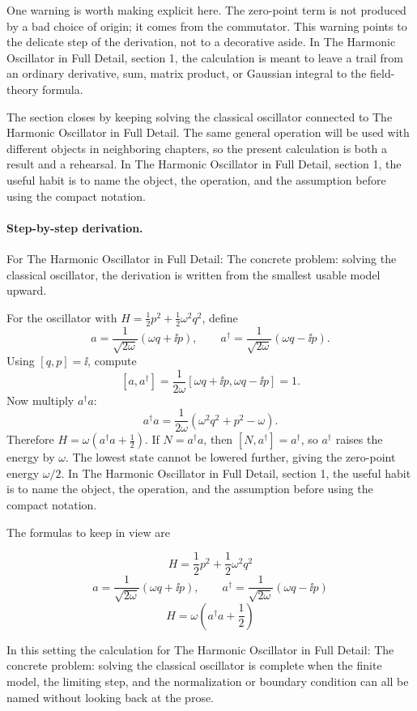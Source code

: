 One warning is worth making explicit here.  The zero-point term is not produced by a bad choice of origin; it comes from the commutator.  This warning points to the delicate step of the derivation, not to a decorative aside.  In The Harmonic Oscillator in Full Detail, section 1, the calculation is meant to leave a trail from an ordinary derivative, sum, matrix product, or Gaussian integral to the field-theory formula.

The section closes by keeping solving the classical oscillator connected to The Harmonic Oscillator in Full Detail.  The same general operation will be used with different objects in neighboring chapters, so the present calculation is both a result and a rehearsal.  In The Harmonic Oscillator in Full Detail, section 1, the useful habit is to name the object, the operation, and the assumption before using the compact notation.



\paragraph{Step-by-step derivation.}

For The Harmonic Oscillator in Full Detail: The concrete problem: solving the classical oscillator, the derivation is written from the smallest usable model upward.

For the oscillator with \(H=\frac12p^2+\frac12\omega^2q^2\), define
\[
  a=\frac{1}{\sqrt{2\omega}}(\omega q+\ii p),\qquad
  a^\dagger=\frac{1}{\sqrt{2\omega}}(\omega q-\ii p).
\]
Using \([q,p]=\ii\), compute
\[
  [a,a^\dagger]
  =
  \frac{1}{2\omega}[\omega q+\ii p,\omega q-\ii p]=1.
\]
Now multiply \(a^\dagger a\):
\[
  a^\dagger a=\frac{1}{2\omega}(\omega^2q^2+p^2-\omega).
\]
Therefore \(H=\omega(a^\dagger a+\frac12)\).  If \(N=a^\dagger a\), then \([N,a^\dagger]=a^\dagger\), so \(a^\dagger\) raises the energy by \(\omega\).  The lowest state cannot be lowered further, giving the zero-point energy \(\omega/2\).  In The Harmonic Oscillator in Full Detail, section 1, the useful habit is to name the object, the operation, and the assumption before using the compact notation.

The formulas to keep in view are

\[
  H=\frac12p^2+\frac12\omega^2q^2
\]
\[
  a=\frac{1}{\sqrt{2\omega}}(\omega q+\ii p),\qquad a^\dagger=\frac{1}{\sqrt{2\omega}}(\omega q-\ii p)
\]
\[
  H=\omega\left(a^\dagger a+\frac12\right)
\]

In this setting the calculation for The Harmonic Oscillator in Full Detail: The concrete problem: solving the classical oscillator is complete when the finite model, the limiting step, and the normalization or boundary condition can all be named without looking back at the prose.




